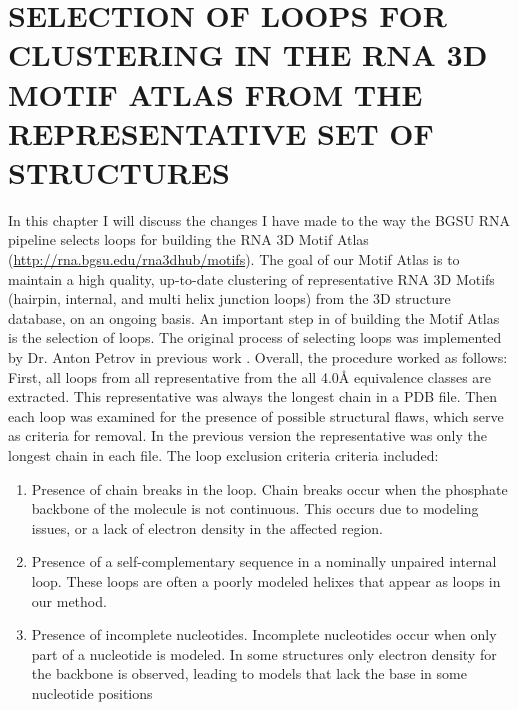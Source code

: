 \chapter{SELECTION OF LOOPS FOR CLUSTERING IN THE RNA 3D MOTIF ATLAS FROM THE
REPRESENTATIVE SET OF STRUCTURES}

In this chapter I will discuss the changes I have made to the way the BGSU RNA
pipeline selects loops for building the RNA 3D Motif Atlas
(\url{http://rna.bgsu.edu/rna3dhub/motifs}). The goal of our Motif Atlas is to
maintain a high quality, up-to-date clustering of representative RNA 3D Motifs
(hairpin, internal, and multi helix junction loops) from the 3D structure
database, on an ongoing basis. An important step in of building the Motif Atlas
is the selection of loops. The original process of selecting loops was
implemented by Dr. Anton Petrov in previous work \cite{Petrov2012}. Overall, the
procedure worked as follows: First, all loops from all representative from the
all 4.0{\AA} equivalence classes are extracted. This representative was always
the longest chain in a PDB file. Then each loop was examined for the presence of
possible structural flaws, which serve as criteria for removal. In the previous
version the representative was only the longest chain in each file. The loop
exclusion criteria criteria included:

\begin{enumerate}
  \item Presence of chain breaks in the loop. Chain breaks occur when the
    phosphate backbone of the molecule is not continuous. This occurs due to
    modeling issues, or a lack of electron density in the affected region.

  \item Presence of a self-complementary sequence in a nominally unpaired
    internal loop. These loops are often a poorly modeled helixes that appear as
    loops in our method.

  \item Presence of incomplete nucleotides. Incomplete nucleotides occur when
    only part of a nucleotide is modeled. In some structures only electron
    density for the backbone is observed, leading to models that lack the base
    in some nucleotide positions
\end{enumerate}


